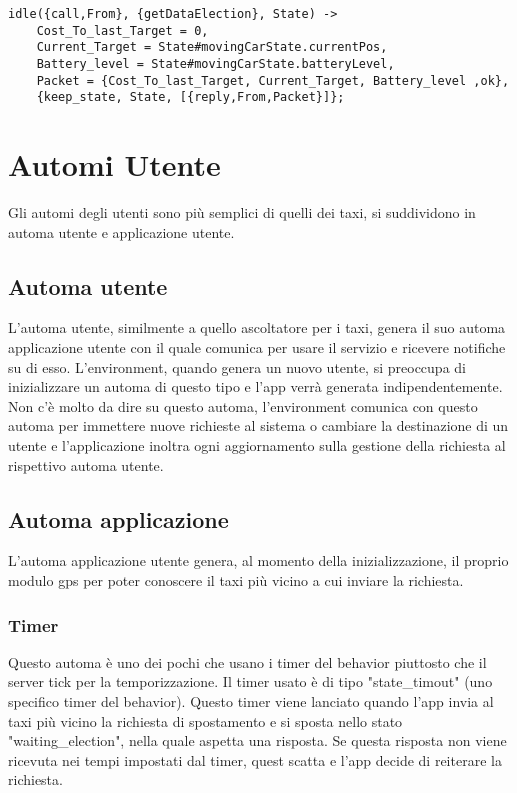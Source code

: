 \begin{lstlisting}
idle({call,From}, {getDataElection}, State) ->
	Cost_To_last_Target = 0,
	Current_Target = State#movingCarState.currentPos,
	Battery_level = State#movingCarState.batteryLevel,
	Packet = {Cost_To_last_Target, Current_Target, Battery_level ,ok},
	{keep_state, State, [{reply,From,Packet}]};
\end{lstlisting}

\section{Automi Utente} \label{automiUtenti}
Gli automi degli utenti sono più semplici di quelli dei taxi, si suddividono in automa utente e applicazione utente. 

\subsection{Automa utente}
L'automa utente, similmente a quello ascoltatore per i taxi, genera il suo automa applicazione utente con il quale comunica per usare il servizio e ricevere notifiche su di esso. L'environment, quando genera un nuovo utente, si preoccupa di inizializzare un automa di questo tipo e l'app verrà generata indipendentemente. 
Non c'è molto da dire su questo automa, l'environment comunica con questo automa per immettere nuove richieste al sistema o cambiare la destinazione di un utente e l'applicazione inoltra ogni aggiornamento sulla gestione della richiesta al rispettivo automa utente.

\subsection{Automa applicazione}
L'automa applicazione utente genera, al momento della inizializzazione, il proprio modulo gps per poter conoscere il taxi più vicino a cui inviare la richiesta. 


\subsubsection{Timer}
Questo automa è uno dei pochi che usano i timer del behavior piuttosto che il server tick per la temporizzazione. Il timer usato è di tipo "state\_timout" (uno specifico timer del behavior). 
Questo timer viene lanciato quando l'app invia al taxi più vicino la richiesta di spostamento e si sposta nello stato "waiting\_election", nella quale aspetta una risposta. Se questa risposta non viene ricevuta nei tempi impostati dal timer, quest scatta e l'app decide di reiterare la richiesta. 

